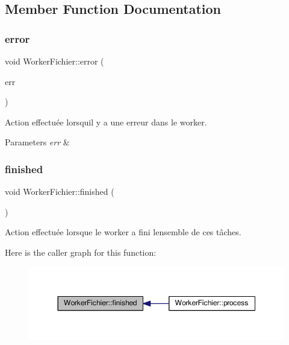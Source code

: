 \subsection{Member Function Documentation}
\mbox{\label{classWorkerFichier_ae7f4b3f3ce2a053855a21d05f13e1f4e}} 
\subsubsection{\texorpdfstring{error}{error}}
{\footnotesize\ttfamily void Worker\+Fichier\+::error (\begin{DoxyParamCaption}\item[{Q\+String}]{err }\end{DoxyParamCaption})\hspace{0.3cm}{\ttfamily [signal]}}



Action effectuée lorsqu\textquotesingle{}il y a une erreur dans le worker. 


\begin{DoxyParams}{Parameters}
{\em err} & \\
\hline
\end{DoxyParams}
\mbox{\label{classWorkerFichier_a829c3872070e4cab2d84c11b7c12dccc}} 
\subsubsection{\texorpdfstring{finished}{finished}}
{\footnotesize\ttfamily void Worker\+Fichier\+::finished (\begin{DoxyParamCaption}{ }\end{DoxyParamCaption})\hspace{0.3cm}{\ttfamily [signal]}}



Action effectuée lorsque le worker a fini l\textquotesingle{}ensemble de ces tâches. 

Here is the caller graph for this function\+:\nopagebreak
\begin{figure}[H]
\begin{center}
\leavevmode
\includegraphics[width=350pt]{classWorkerFichier_a829c3872070e4cab2d84c11b7c12dccc_icgraph}
\end{center}
\end{figure}
\mbox{\label{classWorkerFichier_a3b72efa3a7e2de6f1a8001d999731e11}} 
